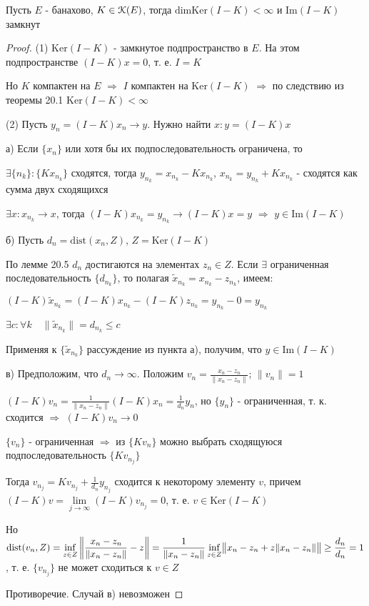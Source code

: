 \documentclass[a4paper,12pt]{report}
\newcommand*{\hm}[1]{#1\nobreak\discretionary{}%
            {\hbox{$\mathsurround=0pt #1$}}{}}
\begin{document}
\begin{lem}
Пусть $E$ - банахово, $K\in\EuScript K(E)$, тогда $\mathrm{dimKer}(I-K)<\infty$ и $\mathrm{Im}(I-K)$ замкнут
\end{lem}
\begin{proof}
(1) $\mathrm{Ker}(I-K)$ - замкнутое подпространство в $E$. На этом подпространстве $(I-K)x=0$, т. е. $I=K$

Но $K$ компактен на $E$ $\Rightarrow$ $I$ компактен на $\mathrm{Ker}(I-K)$ $\Rightarrow$ по следствию из теоремы 20.1 $\mathrm{Ker}(I-K)<\infty$

(2) Пусть $y_n=(I-K)x_n\to y$. Нужно найти $x\colon y=(I-K)x$

а) Если $\{x_n\}$ или хотя бы их подпоследовательность ограничена, то

 $\exists\{n_k\}\colon\{Kx_{n_k}\}$ сходятся, тогда $y_{n_k}=x_{n_k}-K x_{n_k}$, $x_{n_k}=y_{n_k}+Kx_{n_k}$ - сходятся как сумма двух сходящихся

$\exists x\colon x_{n_k}\to x$, тогда $(I-K)x_{n_k}=y_{n_k}\to(I-K)x=y$ $\Rightarrow$ $y\in\mathrm{Im}(I-K)$

б) Пусть $d_n=\mathrm{dist}(x_n,Z)$, $Z=\mathrm{Ker}(I-K)$

По лемме 20.5 $d_n$ достигаются на элементах $z_n\in Z$. Если $\exists$ ограниченная последовательность $\{d_{n_k}\}$, то полагая $\tilde x_{n_k}=x_{n_k}-z_{n_k}$, имеем: 

$(I-K)\tilde x_{n_k}=(I-K)x_{n_k}-(I-K)z_{n_k}=y_{n_k}-0=y_{n_k}$

$\exists c\colon\forall k\quad\|\tilde x_{n_k}\|=d_{n_k}\le c$

Применяя к $\{\tilde x_{n_k}\}$ рассуждение из пункта а), получим, что $y\in\mathrm{Im}(I-K)$

в) Предположим, что $d_n\to\infty$. Положим $v_n=\displaystyle\frac{x_n-z_n}{\|x_n-z_n\|}$; $\|v_n\|=1$

$(I-K)v_n=\displaystyle\frac1{\|x_n-z_n\|}(I-K)x_n=\displaystyle\frac1{d_n}y_n$, но $\{y_n\}$ - ограниченная, т. к. сходится $\Rightarrow$ $(I-K)v_n\to0$

$\{v_n\}$ - ограниченная $\Rightarrow$ из $\{Kv_n\}$ можно выбрать сходящуюся подпоследовательность $\{Kv_{n_j}\}$

Тогда $v_{n_j}=Kv_{n_j}+\displaystyle\frac1{d_n}y_{n_j}$ сходится к некоторому элементу $v$, причем $(I-K)v=\lim\limits_{j\to\infty}(I-K)v_{n_j}=0$, т. е. $v\in\mathrm{Ker}(I-K)$

Но $\mathrm{dist}(v_n,Z)=\inf\limits_{z\in Z}\left\|\displaystyle\frac{x_n-z_n}{\|x_n-z_n\|}-z\right\|=\displaystyle\frac1{\|x_n-z_n\|}\inf\limits_{z\in Z}\bigl\|x_n-z_n+z\|x_n\hm-z_n\|\bigr\|\ge\displaystyle\frac{d_n}{d_n}=1$, т. е. $\{v_{n_j}\}$ не может сходиться к $v\in Z$

Противоречие. Случай в) невозможен
\end{proof}
 
\end{document}
